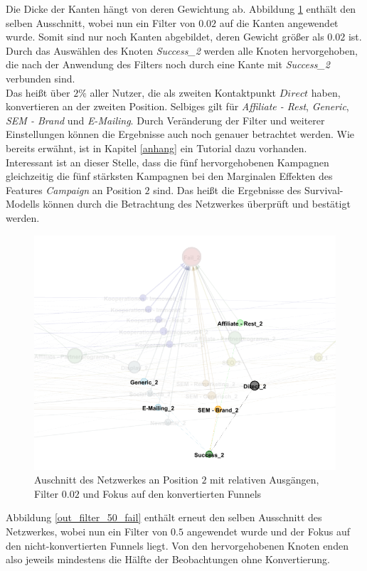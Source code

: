 Die Dicke der Kanten hängt von deren Gewichtung ab. Abbildung \ref{out_filter_2_succ} enthält den selben Ausschnitt, wobei nun ein Filter von $0.02$ auf die Kanten angewendet wurde. Somit sind nur noch Kanten abgebildet, deren Gewicht größer als $0.02$ ist. Durch das Auswählen des Knoten \textit{Success\_2} werden alle Knoten hervorgehoben, die nach der Anwendung des Filters noch durch eine Kante mit \textit{Success\_2} verbunden sind.\\
Das heißt über $2 \%$ aller Nutzer, die als zweiten Kontaktpunkt $Direct$ haben, konvertieren an der zweiten Position. Selbiges gilt für \textit{Affiliate - Rest}, \textit{Generic}, \textit{SEM - Brand} und \textit{E-Mailing}. Durch Veränderung der Filter und weiterer Einstellungen können die Ergebnisse auch noch genauer betrachtet werden. Wie bereits erwähnt, ist in Kapitel \ref{anhang} ein Tutorial dazu vorhanden.\\
Interessant ist an dieser Stelle, dass die fünf hervorgehobenen Kampagnen gleichzeitig die fünf stärksten Kampagnen bei den Marginalen Effekten des Features \textit{Campaign} an Position $2$ sind. Das heißt die Ergebnisse des Survival-Modells können durch die Betrachtung des Netzwerkes überprüft und bestätigt werden.
\begin{figure}[H]
	\centering\includegraphics[scale=0.4]{out_filter_2_succ.png}\caption[Relative Ausgänge mit Filter $0.02$]{Auschnitt des Netzwerkes an Position $2$ mit relativen Ausgängen, Filter $0.02$ und Fokus auf den konvertierten Funnels}\label{out_filter_2_succ}
\end{figure}
Abbildung \ref{out_filter_50_fail} enthält erneut den selben Ausschnitt des Netzwerkes, wobei nun ein Filter von $0.5$ angewendet wurde und der Fokus auf den nicht-konvertierten Funnels liegt. Von den hervorgehobenen Knoten enden also jeweils mindestens die Hälfte der Beobachtungen ohne Konvertierung.\\
